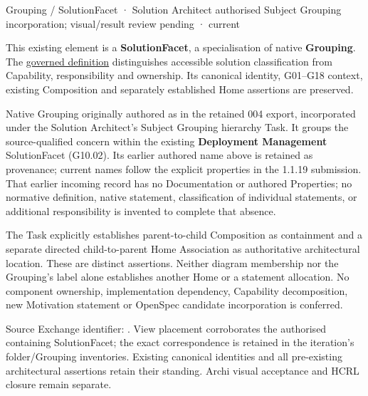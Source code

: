 \label{element:af4f93db10cb47c282600babe51048e1}
{\small Grouping / SolutionFacet · Solution Architect authorised Subject Grouping incorporation; visual/result review pending · current}\par

This existing element is a \textbf{SolutionFacet}, a specialisation of native
\textbf{Grouping}. The \href{\detokenize{../../../../../../../governance/continuum-representation.md#solutionfacet-classification--1119-candidate}}{governed definition}
distinguishes accessible solution classification from Capability, responsibility
and ownership. Its canonical identity, G01–G18 context, existing Composition
and separately established Home assertions are preserved.



Native Grouping originally authored as \texttt{} in the retained 004 export,
incorporated under the Solution Architect's Subject Grouping hierarchy Task.
It groups the source-qualified \texttt{} concern within
the existing \textbf{Deployment Management} SolutionFacet (G10.02). Its earlier authored name above is retained as provenance; current names
follow the explicit properties in the 1.1.19 submission.
That earlier incoming record has no Documentation or authored Properties; no normative
definition, native statement, classification of individual statements, or
additional responsibility is invented to complete that absence.



The Task explicitly establishes parent-to-child Composition as containment and
a separate directed child-to-parent Home Association as authoritative architectural
location. These are distinct assertions. Neither diagram membership nor the
Grouping's label alone establishes another Home or a statement allocation.
No component ownership, implementation dependency, Capability decomposition,
new Motivation statement or OpenSpec candidate incorporation is conferred.



Source Exchange identifier: \texttt{}. View placement corroborates
the authorised containing SolutionFacet; the exact correspondence is retained in the
iteration's folder/Grouping inventories. Existing canonical identities and all
pre-existing architectural assertions retain their standing. Archi visual
acceptance and HCRL closure remain separate.


